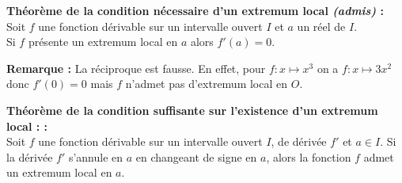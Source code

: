\documentclass[11pt,a4paper]{article}
\begin{document}
\begin{minipage}{0.4\textwidth}
\end{minipage}
\hspace{0.05\textwidth}
\begin{minipage}{0.55\textwidth}
    \begin{mdframed}[style=proprieteStyle]
        \textbf{Théorème de la condition nécessaire d'un extremum local \emph{(admis)} :} ~\\
        Soit $f$ une fonction dérivable sur un intervalle ouvert $I$ et $a$ un réel de $I$. \\
        Si $f$ présente un extremum local en $a$ alors $f'(a)=0$.
    \end{mdframed}
    \textbf{Remarque :} La réciproque est fausse. En effet, pour $f:x\mapsto x^3$ on a $f:x\mapsto 3x^2$ donc $f'(0)=0$
    mais $f$ n'admet pas d'extremum local en $O$.
\end{minipage}

\begin{mdframed}[style=proprieteStyle]
    \textbf{Théorème de la condition suffisante sur l'existence d'un extremum local : :} ~\\
    Soit $f$ une fonction dérivable sur un intervalle ouvert $I$, de dérivée $f'$ et $a\in I$.
    Si la dérivée $f'$ s'annule en $a$ en changeant de signe en $a$, alors la fonction $f$ admet un extremum local en $a$.
\end{mdframed}
\end{document}
